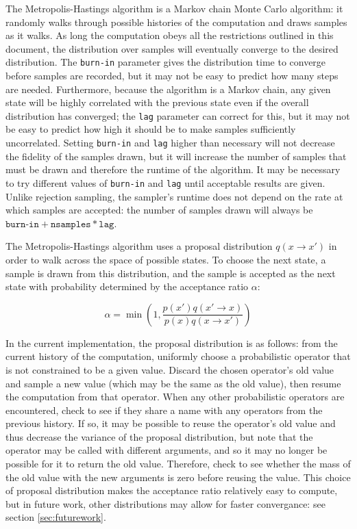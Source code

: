 \documentclass{article}
\begin{document}
\begin{description}
  The Metropolis-Hastings algorithm is a Markov chain Monte Carlo
  algorithm: it randomly walks through possible histories of the
  computation and draws samples as it walks. As long the computation
  obeys all the restrictions outlined in this document, the
  distribution over samples will eventually converge to the desired
  distribution. The \texttt{burn-in} parameter gives the distribution
  time to converge before samples are recorded, but it may not be easy
  to predict how many steps are needed. Furthermore, because the
  algorithm is a Markov chain, any given state will be highly
  correlated with the previous state even if the overall distribution
  has converged; the \texttt{lag} parameter can correct for this, but
  it may not be easy to predict how high it should be to make samples
  sufficiently uncorrelated. Setting \texttt{burn-in} and \texttt{lag}
  higher than necessary will not decrease the fidelity of the samples
  drawn, but it will increase the number of samples that must be drawn
  and therefore the runtime of the algorithm. It may be necessary to
  try different values of \texttt{burn-in} and \texttt{lag} until
  acceptable results are given. Unlike rejection sampling, the
  sampler's runtime does not depend on the rate at which samples are
  accepted: the number of samples drawn will always be
  $\texttt{burn-in} + \texttt{nsamples} * \texttt{lag}$.

  The Metropolis-Hastings algorithm uses a proposal distribution $q( x
  \to x')$ in order to walk across the space of possible states. To
  choose the next state, a sample is drawn from this distribution, and
  the sample is accepted as the next state with probability determined
  by the acceptance ratio $\alpha$:

  \[\alpha = \min \left(1, \frac{p(x') q(x' \to x)}{p(x) q(x \to x')}
  \right)\]

  In the current implementation, the proposal distribution is as
  follows: from the current history of the computation, uniformly
  choose a probabilistic operator that is not constrained to be a
  given value. Discard the chosen operator's old value and sample a
  new value (which may be the same as the old value), then resume the
  computation from that operator. When any other probabilistic
  operators are encountered, check to see if they share a name with
  any operators from the previous history. If so, it may be possible
  to reuse the operator's old value and thus decrease the variance of
  the proposal distribution, but note that the operator may be called
  with different arguments, and so it may no longer be possible for it
  to return the old value. Therefore, check to see whether the mass of
  the old value with the new arguments is zero before reusing the
  value. This choice of proposal distribution makes the acceptance
  ratio relatively easy to compute, but in future work, other
  distributions may allow for faster convergance: see section
  \ref{sec:futurework}.


\end{description}
\end{document}
